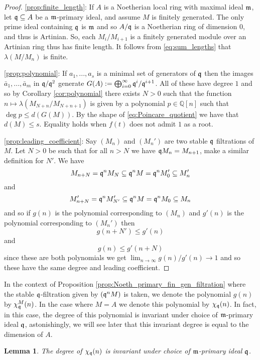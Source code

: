 \documentclass[12pt]{article}
\theoremstyle{plain}
\newtheorem{lemma}[thm]{Lemma}
\theoremstyle{definition}
\newcommand{\bb}[1]{\mathbb{#1}}
\newcommand{\lto}{\longrightarrow}
\begin{document}
\begin{proof}
\ref{prop:finite_length}: If $A$ is a Noetherian local ring with maximal ideal $\frak{m}$, let $\frak{q} \subseteq A$ be a $\frak{m}$-primary ideal, and assume $M$ is finitely generated. The only prime ideal containing $\frak{q}$ is $\frak{m}$ and so $A/\frak{q}$ is a Noetherian ring of dimension $0$, and thus is Artinian. So, each $M_i/M_{i+1}$ is a finitely generated module over an Artinian ring thus has finite length. It follows from \eqref{eq:sum_lengths} that $\lambda(M/M_n)$ is finite.

\ref{prop:polynomial}: If $a_1,...,a_s$ is a minimal set of generators of $\frak{q}$ then the images $\bar{a}_1,...,\bar{a}_m$ in $\frak{q}/\frak{q}^2$ generate $G(A) := \bigoplus_{i = 0}^\infty \frak{q}^i/\frak{q}^{i+1}$. All of these have degree $1$ and so by Corollary \ref{cor:polynomial} there exists $N>0$ such that the function $n \mapsto \lambda(M_{N+n}/M_{N+n+1})$ is given by a polynomial $p \in \bb{Q}[n]$ such that $\operatorname{deg}p \leq d(G(M))$. By the shape of \eqref{eq:Poincare_quotient} we have that $d(M) \leq s$. Equality holds when $f(t)$ does not admit $1$ as a root.

\ref{prop:leading_coefficient}: Say $(M_n)$ and $(M_n')$ are two stable $\frak{q}$ filtrations of $M$. Let $N > 0$ be such that for all $n > N$ we have $\frak{q}M_n = M_{n+1}$, make a similar definition for $N'$. We have
\[M_{n + N} = \frak{q}^n M_N \subseteq \frak{q}^n M = \frak{q}^nM_0' \subseteq M_n'\]
and
\[M_{n + N}' = \frak{q}^n M_{N'}' \subseteq \frak{q}^n M = \frak{q}^nM_0 \subseteq M_n\]
and so if $g(n)$ is the polynomial corresponding to $(M_n)$ and $g'(n)$ is the polynomial corresponding to $(M_n')$ then
\[g(n + N') \leq g'(n)\]
and
\[g(n) \leq g'(n + N)\]
since these are both polynomials we get $\lim_{n \lto \infty}g(n)/g'(n) \lto 1$ and so these have the same degree and leading coefficient.
\end{proof}
In the context of Proposition \ref{prop:Noeth_primary_fin_gen_filtration} where the stable $\frak{q}$-filtration given by $(\frak{q}^nM)$ is taken, we denote the polynomial $g(n)$ by $\chi_{\frak{q}}^M(n)$. In the case where $M = A$ we denote this polynomial by $\chi_\frak{q}(n)$. In fact, in this case, the degree of this polynomial is invariant under choice of $\frak{m}$-primary ideal $\frak{q}$, astonishingly, we will see later that this invariant degree is equal to the dimension of $A$.
\begin{lemma}
\label{lem:invariant_under_primary}
The degree of $\chi_\frak{q}(n)$ is invariant under choice of $\frak{m}$-primary ideal $\frak{q}$.
\end{lemma}
\end{document}
